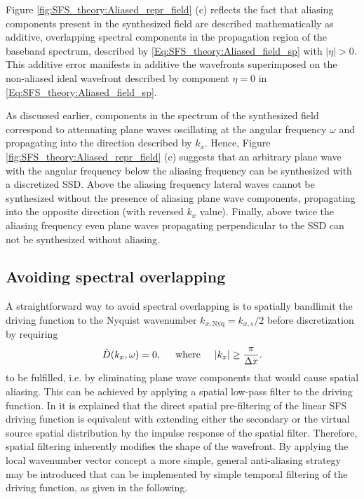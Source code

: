 Figure \ref{fig:SFS_theory:Aliased_repr_field} (c) reflects the fact that aliasing components present in the synthesized field are described mathematically as additive, overlapping spectral components in the propagation region of the baseband spectrum, described by \eqref{Eq:SFS_theory:Aliased_field_sp} with $|\eta|>0$.
This additive error manifests in additive the wavefronts superimposed on the non-aliased ideal wavefront described by component $\eta = 0$ in \eqref{Eq:SFS_theory:Aliased_field_sp}.

As discussed earlier, components in the spectrum of the synthesized field correspond to attenuating plane waves oscillating at the angular frequency $\omega$ and propagating into the direction described by $k_x$.
Hence, Figure \ref{fig:SFS_theory:Aliased_repr_field} (c) suggests that an arbitrary plane wave with the angular frequency below the aliasing frequency can be synthesized with a discretized SSD.
Above the aliasing frequency lateral waves cannot be synthesized without the presence of aliasing plane wave components, propagating into the opposite direction (with reversed $k_x$ value).
Finally, above twice the aliasing frequency even plane waves propagating perpendicular to the SSD can not be synthesized without aliasing.

\subsection{Avoiding spectral overlapping}

A straightforward way to avoid spectral overlapping is to spatially bandlimit the driving function to the Nyquist wavenumber $k_{x,\mathrm{Nyq}} = k_{x,s}/2$ before discretization by requiring
\begin{equation}
\tilde{D}(k_x,\omega) = 0, \hspace{5mm} \text{where} \hspace{5mm} |k_x| \geq \frac{\pi}{\Delta x}.
\label{Eq:SFS_theory:AA_in_kx}
\end{equation}
to be fulfilled, i.e. by eliminating plane wave components that would cause spatial aliasing.
This can be achieved by applying a spatial low-pass filter to the driving function.
In \cite{Firtha2012:isma, Ahrens2012} it is explained that the direct spatial pre-filtering of the linear SFS driving function is equivalent with extending either the secondary or the virtual source spatial distribution by the impulse response of the spatial filter.
Therefore, spatial filtering inherently modifies the shape of the wavefront.
By applying the local wavenumber vector concept a more simple, general anti-aliasing strategy may be introduced that can be implemented by simple temporal filtering of the driving function, as given in the following.

